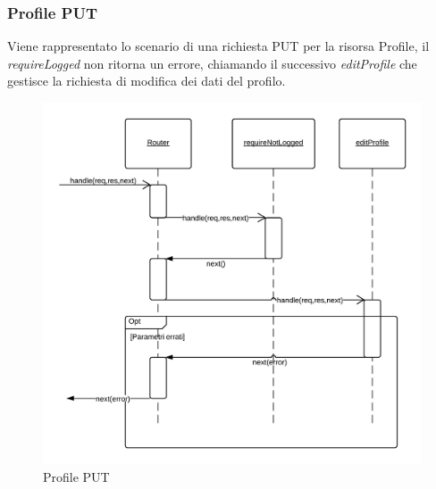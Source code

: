 \subsubsection{Profile PUT} 
Viene rappresentato lo scenario di una richiesta PUT per la risorsa Profile, il \emph{requireLogged} non ritorna un errore, chiamando il successivo  \emph{editProfile} che gestisce la richiesta di modifica dei dati del profilo.
\begin{figure}[H]
	\begin{center} 
		\includegraphics[scale=0.20]{scenari/Profile PUT.png} 
		\caption{Profile PUT}
	\end{center} 
\end{figure}

